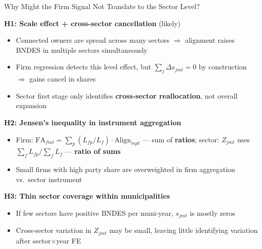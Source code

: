 \documentclass[aspectratio=169,11pt]{beamer}
\newcommand{\Align}{\mathrm{Align}}
\newcommand{\FA}{\mathrm{FA}}
\begin{document}
\begin{frame}{Why Might the Firm Signal Not Translate to the Sector Level?}

\textbf{H1: Scale effect + cross-sector cancellation} \textcolor{notegreen}{(likely)}
\begin{itemize}
    \item Connected owners are spread across many sectors $\Rightarrow$ alignment raises BNDES in multiple sectors simultaneously
    \item Firm regression detects this level effect, but $\sum_j \Delta s_{jmt} = 0$ by construction $\Rightarrow$ gains cancel in shares
    \item Sector first stage only identifies \textbf{cross-sector reallocation}, not overall expansion
\end{itemize}

\medskip

\textbf{H2: Jensen's inequality in instrument aggregation}
\begin{itemize}
    \item Firm: $\FA_{fmt} = \sum_p (L_{fp}/L_f) \cdot \Align_{mpt}$ --- sum of \textbf{ratios}; sector: $Z_{jmt}$ uses $\sum_f L_{fp}/\sum_f L_f$ --- \textbf{ratio of sums}
    \item Small firms with high party share are overweighted in firm aggregation vs.\ sector instrument
\end{itemize}

\medskip

\textbf{H3: Thin sector coverage within municipalities}
\begin{itemize}
    \item If few sectors have positive BNDES per muni-year, $s_{jmt}$ is mostly zeros
    \item Cross-sector variation in $Z_{jmt}$ may be small, leaving little identifying variation after sector$\times$year FE
\end{itemize}

\end{frame}
\end{document}
